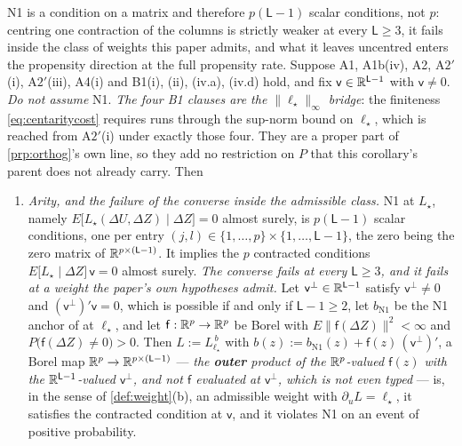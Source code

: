 \begin{corollary}\label{cor:centarity}
N1 is a condition on a matrix and therefore $p(\mathsf L-1)$ scalar conditions, not $p$: centring one
contraction of the columns is strictly weaker at every $\mathsf L\ge3$, it fails inside the class of
weights this paper admits, and what it leaves uncentred enters the propensity direction at the full
propensity rate.
Suppose A1, A1b(iv), A2, A$2'$(i), A$2'$(iii), A4(i) and B1(i), (ii), (iv.a), (iv.d) hold, and fix
$\mathsf v\in\mathbb{R}^{\mathsf L-1}$
with $\mathsf v\ne0$. \emph{Do not assume} N1.
\emph{The four B1 clauses are the $\|\ell_\star\|_\infty$ bridge}: the finiteness
\eqref{eq:centaritycost} requires runs through the sup-norm bound on $\ell_\star$, which is reached from
A$2'$(i) under exactly those four. They are a proper part of \cref{prp:orthog}'s own line, so they add
no restriction on $P$ that this corollary's parent does not already carry. Then
\begin{enumerate}
\item[(i)] \emph{Arity, and the failure of the converse inside the admissible class.} N1 at $L_\star$,
namely $E\big[L_\star(\Delta U,\Delta Z)\mid\Delta Z\big]=0$ almost surely, is $p(\mathsf L-1)$ scalar
conditions, one per entry $(j,l)\in\{1,\dots,p\}\times\{1,\dots,\mathsf L-1\}$, the zero being the zero
matrix of $\mathbb{R}^{p\times(\mathsf L-1)}$. It implies the $p$ contracted conditions
$E\big[L_\star\mid\Delta Z\big]\,\mathsf v=0$ almost surely. \emph{The converse fails at every
$\mathsf L\ge3$, and it fails at a weight the paper's own hypotheses admit.} Let
$\mathsf v^{\perp}\in\mathbb{R}^{\mathsf L-1}$ satisfy $\mathsf v^{\perp}\ne0$ and
$(\mathsf v^{\perp})'\mathsf v=0$, which is possible if and only if $\mathsf L-1\ge2$, let
$b_{\mathrm{N1}}$ be the N1 anchor of  at $\ell_\star$, and let
$\mathsf f:\mathbb{R}^{p}\to\mathbb{R}^{p}$ be Borel with $E\|\mathsf f(\Delta Z)\|^{2}<\infty$ and
$P\big(\mathsf f(\Delta Z)\ne0\big)>0$. Then
$L:=L^{\,b}_{\ell_\star}$ with $b(z):=b_{\mathrm{N1}}(z)+\mathsf f(z)\,(\mathsf v^{\perp})'$, a Borel map
$\mathbb{R}^{p}\to\mathbb{R}^{p\times(\mathsf L-1)}$ --- \emph{the \textbf{outer} product of the $\mathbb{R}^{p}$-valued
$\mathsf f(z)$ with the $\mathbb{R}^{\mathsf L-1}$-valued $\mathsf v^{\perp}$, and not $\mathsf f$ evaluated at
$\mathsf v^{\perp}$, which is not even typed} --- is, in the sense of
\cref{def:weight}\textup{(b)}, an admissible weight with $\partial_uL=\ell_\star$, it satisfies the
contracted condition at $\mathsf v$, and it violates N1 on an event of positive probability.

\end{enumerate}
\end{corollary}
